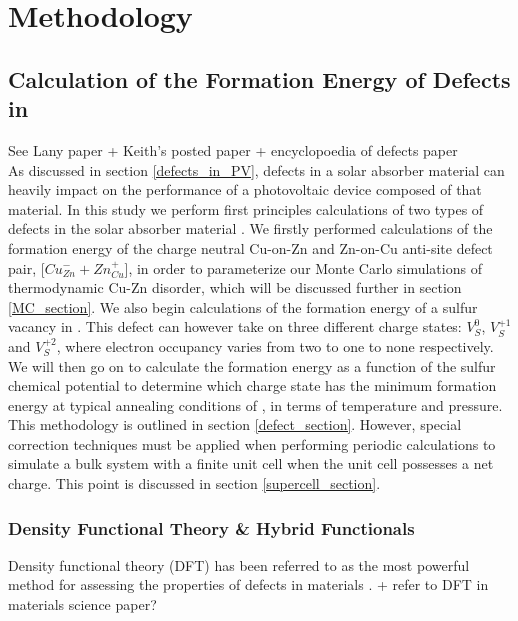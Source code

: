 \chapter{Methodology}

\section{Calculation of the Formation Energy of Defects in \CZTS}
See Lany paper + Keith's posted paper + encyclopoedia of defects paper \\

As discussed in section \ref{defects_in_PV}, defects in a solar absorber material can heavily impact on the performance of a photovoltaic device composed of that material. In this study we perform first principles calculations of two types of defects in the solar absorber material { \CZTS }. We firstly performed calculations of the formation energy of the charge neutral Cu-on-Zn and Zn-on-Cu anti-site defect pair, [$Cu_{Zn}^- + Zn_{Cu}^+$], in order to parameterize our Monte Carlo simulations of thermodynamic Cu-Zn disorder, which will be discussed further in section \ref{MC_section}. We also begin calculations of the formation energy of a sulfur vacancy in { \CZTS }. This defect can however take on three different charge states: $V_{S}^{0}$, $V_{S}^{+1}$ and $V_{S}^{+2}$, where electron occupancy varies from two to one to none respectively. We will then go on to calculate the formation energy as a function of the sulfur chemical potential to determine which charge state has the minimum formation energy at typical annealing conditions of { \CZTS }, in terms of temperature and pressure. This methodology is outlined in section \ref{defect_section}. However, special correction techniques must be applied when performing periodic calculations to simulate a bulk system with a finite unit cell when the unit cell possesses a net charge. This point is discussed in section \ref{supercell_section}.


\cite{defects_tutorial}



\subsection{Density Functional Theory \& Hybrid Functionals}\label{DFT_section}
Density functional theory (DFT) has been referred to as the most powerful method for assessing the properties of defects in materials \cite{defects_tutorial}. + refer to DFT in materials science paper?\\

